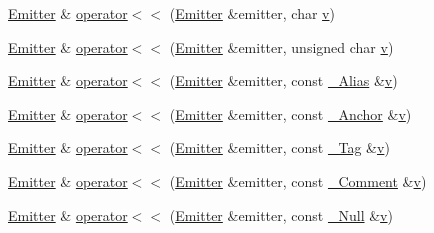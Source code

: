 \begin{DoxyCompactItemize}
\mbox{\hyperlink{class_y_a_m_l_1_1_emitter}{Emitter}} \& \mbox{\hyperlink{namespace_y_a_m_l_a48cc2eced24b95c83b7b5e22ef0568dd}{operator$<$$<$}} (\mbox{\hyperlink{class_y_a_m_l_1_1_emitter}{Emitter}} \&emitter, char \mbox{\hyperlink{glad_8h_a14cfbe2fc2234f5504618905b69d1e06}{v}})
\item 
\mbox{\hyperlink{class_y_a_m_l_1_1_emitter}{Emitter}} \& \mbox{\hyperlink{namespace_y_a_m_l_ab5da6ea293f8ce1ed4c0c8c0f131ea53}{operator$<$$<$}} (\mbox{\hyperlink{class_y_a_m_l_1_1_emitter}{Emitter}} \&emitter, unsigned char \mbox{\hyperlink{glad_8h_a14cfbe2fc2234f5504618905b69d1e06}{v}})
\item 
\mbox{\hyperlink{class_y_a_m_l_1_1_emitter}{Emitter}} \& \mbox{\hyperlink{namespace_y_a_m_l_a0cf2ac1f6a1ee0e345dd5526ed498d0e}{operator$<$$<$}} (\mbox{\hyperlink{class_y_a_m_l_1_1_emitter}{Emitter}} \&emitter, const \mbox{\hyperlink{struct_y_a_m_l_1_1___alias}{\+\_\+\+Alias}} \&\mbox{\hyperlink{glad_8h_a14cfbe2fc2234f5504618905b69d1e06}{v}})
\item 
\mbox{\hyperlink{class_y_a_m_l_1_1_emitter}{Emitter}} \& \mbox{\hyperlink{namespace_y_a_m_l_ad124dac9a7117bd27b7df70ccce95742}{operator$<$$<$}} (\mbox{\hyperlink{class_y_a_m_l_1_1_emitter}{Emitter}} \&emitter, const \mbox{\hyperlink{struct_y_a_m_l_1_1___anchor}{\+\_\+\+Anchor}} \&\mbox{\hyperlink{glad_8h_a14cfbe2fc2234f5504618905b69d1e06}{v}})
\item 
\mbox{\hyperlink{class_y_a_m_l_1_1_emitter}{Emitter}} \& \mbox{\hyperlink{namespace_y_a_m_l_a470884ef87ed9df21f01fafec074f2a4}{operator$<$$<$}} (\mbox{\hyperlink{class_y_a_m_l_1_1_emitter}{Emitter}} \&emitter, const \mbox{\hyperlink{struct_y_a_m_l_1_1___tag}{\+\_\+\+Tag}} \&\mbox{\hyperlink{glad_8h_a14cfbe2fc2234f5504618905b69d1e06}{v}})
\item 
\mbox{\hyperlink{class_y_a_m_l_1_1_emitter}{Emitter}} \& \mbox{\hyperlink{namespace_y_a_m_l_a9080ec52e398271bdef81bdddf99be1d}{operator$<$$<$}} (\mbox{\hyperlink{class_y_a_m_l_1_1_emitter}{Emitter}} \&emitter, const \mbox{\hyperlink{struct_y_a_m_l_1_1___comment}{\+\_\+\+Comment}} \&\mbox{\hyperlink{glad_8h_a14cfbe2fc2234f5504618905b69d1e06}{v}})
\item 
\mbox{\hyperlink{class_y_a_m_l_1_1_emitter}{Emitter}} \& \mbox{\hyperlink{namespace_y_a_m_l_a8c8d0d55ea1e4509615dd64a9f13a570}{operator$<$$<$}} (\mbox{\hyperlink{class_y_a_m_l_1_1_emitter}{Emitter}} \&emitter, const \mbox{\hyperlink{struct_y_a_m_l_1_1___null}{\+\_\+\+Null}} \&\mbox{\hyperlink{glad_8h_a14cfbe2fc2234f5504618905b69d1e06}{v}})
\item 

\end{DoxyCompactItemize}
